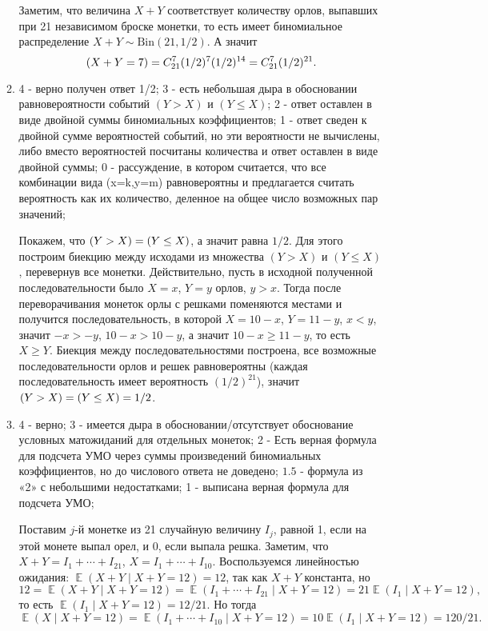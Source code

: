 \documentclass[12pt]{article}
\let\P\relax
\DeclareMathOperator{\P}{\mathbb{P}}
\DeclareMathOperator{\E}{\mathbb{E}}
\newcommand{\dBin}{\mathrm{Bin}}
\begin{document}
\begin{enumerate}
\begin{enumerate}
Заметим, что величина $X+Y$ соответствует количеству орлов, выпавших при 21 независимом броске монетки, 
то есть имеет биномиальное распределение $X+Y\sim \dBin(21,1/2)$. 
А значит 
\[
\P(X+Y=7)=C_{21}^7(1/2)^7(1/2)^{14}=C_{21}^7(1/2)^{21}.
\]

\item 4 - верно получен ответ 1/2;
3 - есть небольшая дыра в обосновании равновероятности событий $(Y>X)$ и $(Y \leq X)$;
2 - ответ оставлен в виде двойной суммы биномиальных коэффициентов;
1 - ответ сведен к двойной сумме вероятностей событий, но эти вероятности не вычислены, либо вместо вероятностей посчитаны количества и ответ оставлен в виде двойной суммы;
0 - рассуждение, в котором считается, что все комбинации вида (x=k,y=m) равновероятны и предлагается считать вероятность как их количество, деленное на общее число возможных пар значений;

Покажем, что $\P(Y>X) = \P(Y\leq X)$, а значит равна $1/2$.
Для этого построим биекцию между исходами из множества $(Y>X)$ и $(Y\leq X)$, перевернув все монетки. 
Действительно, пусть в исходной полученной последовательности было $X=x$, $Y=y$ орлов, $y>x$. 
Тогда после переворачивания монеток орлы с решками поменяются местами и получится последовательность, 
в которой $X=10-x$, $Y=11-y$, $x<y$, значит $-x>-y$, $10-x>10-y$, а значит $10-x\geq 11-y$, то есть $X\geq Y$. 
Биекция между последовательностями построена, 
все возможные последовательности орлов и решек равновероятны (каждая последовательность имеет вероятность $(1/2)^{21}$), значит $\P(Y > X) = \P(Y\leq X)=1/2$.

\item  4 - верно;
3 - имеется дыра в обосновании/отсутствует обоснование условных матожиданий для отдельных монеток;
2 - Есть верная формула для подсчета УМО через суммы произведений биномиальных коэффициентов, но до числового ответа не доведено;
$1.5$ - формула из «2» с небольшими недостатками;
1 - выписана верная формула для подсчета УМО;

Поставим $j$-й монетке из 21 случайную величину $I_j$, равной 1, если на этой монете выпал орел, и 0, если выпала решка. 
Заметим, что $X+Y=I_1+\cdots+I_{21}$, $X=I_1+\cdots +I_{10}$. 
Воспользуемся линейностью ожидания: $\E(X+Y \mid X+Y=12)=12$, так как $X+Y$ константа, но  
\[
12=\E(X+Y \mid X+Y=12)=\E(I_1+\cdots+I_{21} \mid X+Y=12) = 21\E(I_1 \mid X+Y=12),
\]
то есть $\E(I_1 \mid X+Y=12)=12/21$. Но тогда 
\[
\E(X \mid X+Y=12) = \E(I_1+\cdots+I_{10} \mid X+Y=12) = 10 \E(I_1 \mid X + Y = 12) = 120/21.
\]


\end{enumerate}
\end{enumerate}
\end{document}
